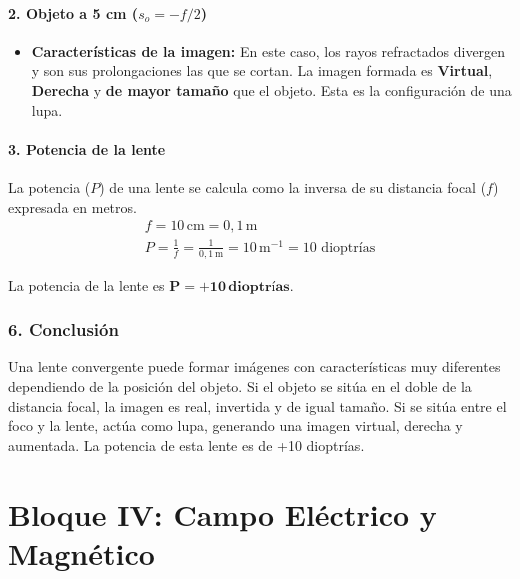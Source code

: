 \paragraph{2. Objeto a 5 cm ($s_o = -f/2$)}
\begin{itemize}
    \item \textbf{Características de la imagen:} En este caso, los rayos refractados divergen y son sus prolongaciones las que se cortan. La imagen formada es \textbf{Virtual}, \textbf{Derecha} y \textbf{de mayor tamaño} que el objeto. Esta es la configuración de una lupa.
\end{itemize}

\paragraph{3. Potencia de la lente}
La potencia ($P$) de una lente se calcula como la inversa de su distancia focal ($f$) expresada en metros.
\begin{gather}
    f = 10 \, \text{cm} = 0,1 \, \text{m} \\
    P = \frac{1}{f} = \frac{1}{0,1 \, \text{m}} = 10 \, \text{m}^{-1} = 10 \text{ dioptrías}
\end{gather}
\begin{cajaresultado}
    La potencia de la lente es $\boldsymbol{P = +10 \, \textbf{dioptrías}}$.
\end{cajaresultado}

\subsubsection*{6. Conclusión}
\begin{cajaconclusion}
Una lente convergente puede formar imágenes con características muy diferentes dependiendo de la posición del objeto. Si el objeto se sitúa en el doble de la distancia focal, la imagen es real, invertida y de igual tamaño. Si se sitúa entre el foco y la lente, actúa como lupa, generando una imagen virtual, derecha y aumentada. La potencia de esta lente es de +10 dioptrías.
\end{cajaconclusion}

\newpage

\section{Bloque IV: Campo Eléctrico y Magnético}
\label{sec:em_2001_jun_ord}

